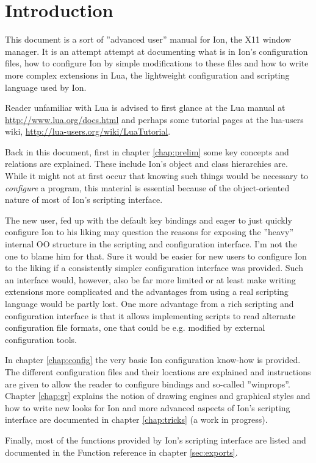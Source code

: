 
\chapter{Introduction}

This document is a sort of ''advanced user'' manual for Ion, the X11
window manager. It is an attempt attempt at documenting what is in Ion's
configuration files, how to configure Ion by simple modifications to these
files and how to write more complex extensions in Lua, the lightweight
configuration and scripting language used by Ion. 

Reader unfamiliar with Lua is advised to first glance at the Lua manual
at \url{http://www.lua.org/docs.html} and perhaps some tutorial pages at
the lua-users wiki, \url{http://lua-users.org/wiki/LuaTutorial}.

Back in this document, first in chapter \ref{chap:prelim} some key
concepts and relations are explained. These include Ion's object and
class hierarchies are. While it might not at first occur that knowing
such things would be necessary to \emph{configure} a program, this 
material is essential because of the object-oriented nature of most 
of Ion's scripting interface.

The new user, fed up with the default key bindings and eager to just
quickly configure Ion to his liking may question the reasons for 
exposing the ''heavy'' internal OO structure in the scripting and
configuration interface. I'm not the one to  blame him for that. 
Sure it would be easier for new users to  configure Ion to the liking
if a consistently simpler configuration interface was provided. Such an
interface would, however, also be far more limited or at least make 
writing extensions more complicated and the advantages from using a 
real scripting language would be partly lost. One more advantage from
a rich scripting and configuration interface is that it allows 
implementing scripts to read alternate configuration file formats,
one that could be e.g. modified by external configuration tools. 

In chapter \ref{chap:config} the very basic Ion configuration know-how
is provided. The different configuration files and their locations
are explained and instructions are given to allow the reader to
configure bindings and so-called ''winprops''.  Chapter \ref{chap:gr}
explains the notion of drawing engines and graphical styles and how to
write new looks for Ion and more advanced aspects of Ion's scripting 
interface are documented in chapter \ref{chap:tricks} (a work in 
progress).

Finally, most of the functions provided by Ion's scripting interface
are listed and documented in the Function reference in 
chapter \ref{sec:exports}.


